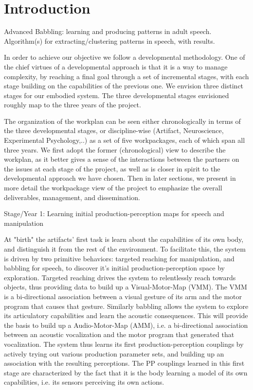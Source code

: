 
\section{Introduction}

Advanced Babbling: learning and producing patterns in adult
speech. Algorithm(s) for extracting/clustering patterns in speech,
with results.

In order to achieve our objective we follow a developmental
methodology. One of the chief virtues of a developmental approach is
that it is a way to manage complexity, by reaching a final goal
through a set of incremental stages, with each stage building on the
capabilities of the previous one. We envision three distinct stages
for our embodied system. The three developmental stages envisioned
roughly map to the three years of the project.

The organization of the workplan can be seen either chronologically in
terms of the three developmental stages, or discipline-wise (Artifact,
Neuroscience, Experimental Psychology,..) as a set of five
workpackages, each of which span all three years. We first adopt the
former (chronological) view to describe the workplan, as it better
gives a sense of the interactions between the partners on the issues
at each stage of the project, as well as is closer in spirit to the
developmental approach we have chosen. Then in later sections, we
present in more detail the workpackage view of the project to
emphasize the overall deliverables, management, and dissemination.

Stage/Year 1: Learning initial production-perception maps for speech
and manipulation

At "birth" the artifacts' first task is learn about the capabilities
of its own body, and distinguish it from the rest of the
environment. To facilitate this, the system is driven by two primitive
behaviors: targeted reaching for manipulation, and babbling for
speech, to discover it's initial production-perception space by
exploration. Targeted reaching drives the system to relentlessly reach
towards objects, thus providing data to build up a Visual-Motor-Map
(VMM). The VMM is a bi-directional association between a visual
gesture of its arm and the motor program that causes that
gesture. Similarly babbling allows the system to explore its
articulatory capabilities and learn the acoustic consequences. This
will provide the basis to build up a Audio-Motor-Map (AMM), i.e. a
bi-directional association between an acoustic vocalization and the
motor program that generated that vocalization. The system thus learns
its first production-perception couplings by actively trying out
various production parameter sets, and building up an association with
the resulting perceptions. The PP couplings learned in this first
stage are characterized by the fact that it is the body learning a
model of its own capabilities, i.e. its sensors perceiving its own
actions.

